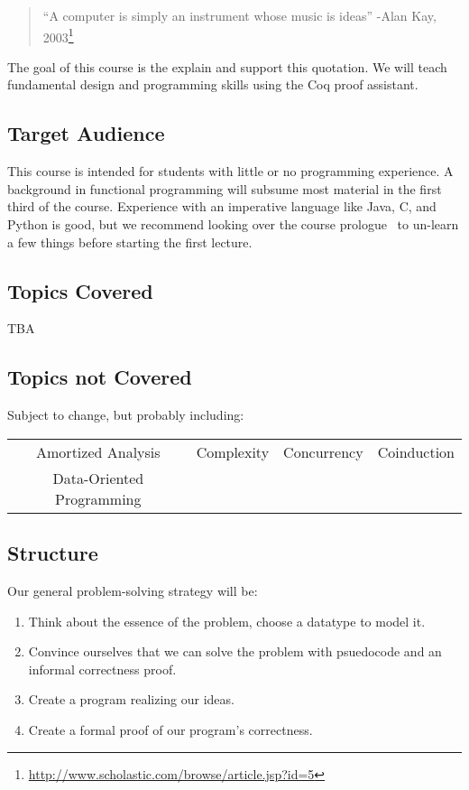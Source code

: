 \documentclass{article}
\begin{document}
\maketitle

\begin{quote}
  ``A computer is simply an instrument whose music is ideas'' -Alan Kay, 2003\footnote{\url{http://www.scholastic.com/browse/article.jsp?id=5}}
\end{quote}

The goal of this course is the explain and support this quotation.
We will teach fundamental design and programming skills using the Coq proof assistant.

\subsection*{Target Audience}
This course is intended for students with little or no programming experience.
A background in functional programming will subsume most material in the first third of the course.
Experience with an imperative language like Java, C, and Python is good, but we recommend looking over the course prologue~\cite{TODO} to un-learn a few things before starting the first lecture.

\subsection*{Topics Covered}
TBA

\subsection*{Topics not Covered}
Subject to change, but probably including:

\begin{center}
  \begin{tabular}{c c c c}
    Amortized Analysis & Complexity & Concurrency & Coinduction
  \\Data-Oriented Programming & & &
  \end{tabular}
\end{center}

\subsection*{Structure}
Our general problem-solving strategy will be:
\begin{enumerate}
\item Think about the essence of the problem, choose a datatype to model it.
\item Convince ourselves that we can solve the problem with psuedocode and an informal correctness proof.
\item Create a program realizing our ideas.
\item Create a formal proof of our program's correctness.
\end{enumerate}
\end{document}
